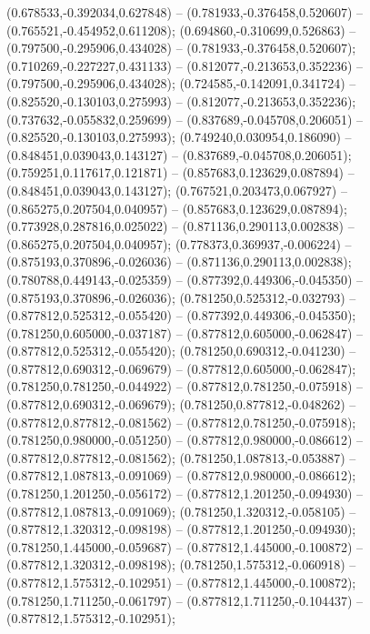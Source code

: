  (0.678533,-0.392034,0.627848) -- (0.781933,-0.376458,0.520607) -- (0.765521,-0.454952,0.611208);
 (0.694860,-0.310699,0.526863) -- (0.797500,-0.295906,0.434028) -- (0.781933,-0.376458,0.520607);
 (0.710269,-0.227227,0.431133) -- (0.812077,-0.213653,0.352236) -- (0.797500,-0.295906,0.434028);
 (0.724585,-0.142091,0.341724) -- (0.825520,-0.130103,0.275993) -- (0.812077,-0.213653,0.352236);
 (0.737632,-0.055832,0.259699) -- (0.837689,-0.045708,0.206051) -- (0.825520,-0.130103,0.275993);
 (0.749240,0.030954,0.186090) -- (0.848451,0.039043,0.143127) -- (0.837689,-0.045708,0.206051);
 (0.759251,0.117617,0.121871) -- (0.857683,0.123629,0.087894) -- (0.848451,0.039043,0.143127);
 (0.767521,0.203473,0.067927) -- (0.865275,0.207504,0.040957) -- (0.857683,0.123629,0.087894);
 (0.773928,0.287816,0.025022) -- (0.871136,0.290113,0.002838) -- (0.865275,0.207504,0.040957);
 (0.778373,0.369937,-0.006224) -- (0.875193,0.370896,-0.026036) -- (0.871136,0.290113,0.002838);
 (0.780788,0.449143,-0.025359) -- (0.877392,0.449306,-0.045350) -- (0.875193,0.370896,-0.026036);
 (0.781250,0.525312,-0.032793) -- (0.877812,0.525312,-0.055420) -- (0.877392,0.449306,-0.045350);
 (0.781250,0.605000,-0.037187) -- (0.877812,0.605000,-0.062847) -- (0.877812,0.525312,-0.055420);
 (0.781250,0.690312,-0.041230) -- (0.877812,0.690312,-0.069679) -- (0.877812,0.605000,-0.062847);
 (0.781250,0.781250,-0.044922) -- (0.877812,0.781250,-0.075918) -- (0.877812,0.690312,-0.069679);
 (0.781250,0.877812,-0.048262) -- (0.877812,0.877812,-0.081562) -- (0.877812,0.781250,-0.075918);
 (0.781250,0.980000,-0.051250) -- (0.877812,0.980000,-0.086612) -- (0.877812,0.877812,-0.081562);
 (0.781250,1.087813,-0.053887) -- (0.877812,1.087813,-0.091069) -- (0.877812,0.980000,-0.086612);
 (0.781250,1.201250,-0.056172) -- (0.877812,1.201250,-0.094930) -- (0.877812,1.087813,-0.091069);
 (0.781250,1.320312,-0.058105) -- (0.877812,1.320312,-0.098198) -- (0.877812,1.201250,-0.094930);
 (0.781250,1.445000,-0.059687) -- (0.877812,1.445000,-0.100872) -- (0.877812,1.320312,-0.098198);
 (0.781250,1.575312,-0.060918) -- (0.877812,1.575312,-0.102951) -- (0.877812,1.445000,-0.100872);
 (0.781250,1.711250,-0.061797) -- (0.877812,1.711250,-0.104437) -- (0.877812,1.575312,-0.102951);
